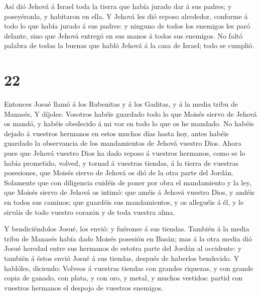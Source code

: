  Así dió Jehová á Israel toda la tierra que había jurado
dar á sus padres; y poseyéronla, y habitaron en ella.  Y
Jehová les dió reposo alrededor, conforme á todo lo que había jurado á
sus padres: y ninguno de todos los enemigos les paró delante, sino que
Jehová entregó en sus manos á todos sus enemigos.  No faltó
palabra de todas la buenas que habló Jehová á la casa de Israel; todo se
cumplió.

\hypertarget{section-21}{%
\section{22}\label{section-21}}

 Entonces Josué llamó á los Rubenitas y á los Gaditas, y á
la media tribu de Manasés,  Y díjoles: Vosotros habéis
guardado todo lo que Moisés siervo de Jehová os mandó, y habéis
obedecido á mi voz en todo lo que os he mandado.  No habéis
dejado á vuestros hermanos en estos muchos días hasta hoy, antes habéis
guardado la observancia de los mandamientos de Jehová vuestro Dios.
 Ahora pues que Jehová vuestro Dios ha dado reposo á
vuestros hermanos, como se lo había prometido, volved, y tornad á
vuestras tiendas, á la tierra de vuestras posesiones, que Moisés siervo
de Jehová os dió de la otra parte del Jordán.  Solamente que
con diligencia cuidéis de poner por obra el mandamiento y la ley, que
Moisés siervo de Jehová os intimó: que améis á Jehová vuestro Dios, y
andéis en todos sus caminos; que guardéis sus mandamientos, y os
alleguéis á él, y le sirváis de todo vuestro corazón y de toda vuestra
alma.

 Y bendiciéndolos Josué, los envió: y fuéronse á sus
tiendas.  También á la media tribu de Manasés había dado
Moisés posesión en Basán; mas á la otra media dió Josué heredad entre
sus hermanos de estotra parte del Jordán al occidente: y también á éstos
envió Josué á sus tiendas, después de haberlos bendecido.  Y
hablóles, diciendo: Volveos á vuestras tiendas con grandes riquezas, y
con grande copia de ganado, con plata, y con oro, y metal, y muchos
vestidos: partid con vuestros hermanos el despojo de vuestros enemigos.

